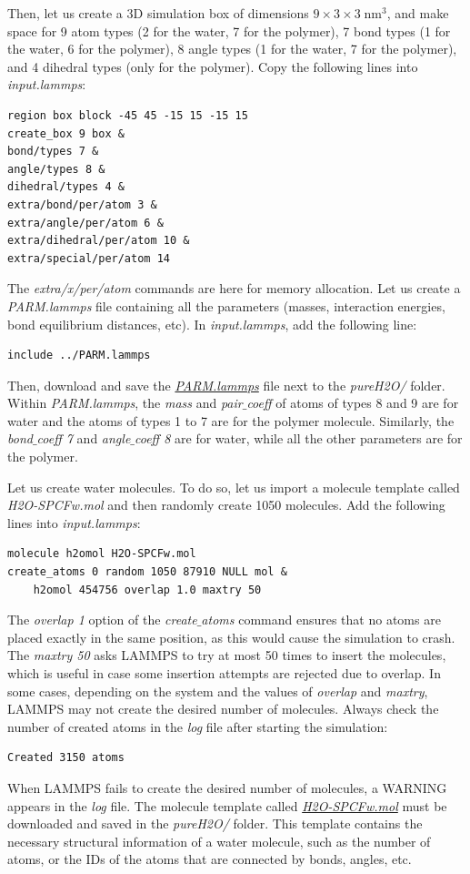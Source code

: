 \documentclass[9pt,tutorial]{livecoms}
\begin{document}
Then, let us create a 3D simulation box of dimensions $9 \times 3 \times 3 \; \text{nm}^3$, and make space for 9 atom types (2 for the water, 7 for the polymer), 7 bond types (1 for the water, 6 for the polymer), 8 angle types (1 for the water, 7 for the polymer), and 4 dihedral types (only for the polymer). Copy the following lines into \textit{input.lammps}:
{\normalsize \begin{verbatim}
region box block -45 45 -15 15 -15 15
create_box 9 box &
bond/types 7 &
angle/types 8 &
dihedral/types 4 &
extra/bond/per/atom 3 &
extra/angle/per/atom 6 &
extra/dihedral/per/atom 10 &
extra/special/per/atom 14
\end{verbatim}}
The \textit{extra/x/per/atom} commands are here for
memory allocation.
Let us create a \textit{PARM.lammps} file containing all the parameters (masses, interaction energies, bond equilibrium
distances, etc). In \textit{input.lammps}, add the following line:
{\normalsize \begin{verbatim}
include ../PARM.lammps
\end{verbatim}}
Then, download and save the \href{https://raw.githubusercontent.com/lammpstutorials/lammpstutorials-article/main/files/tutorial3/PARM.lammps}{\textit{PARM.lammps}} file next to the \textit{pureH2O/} folder. Within \textit{PARM.lammps}, the \textit{mass} and \textit{pair$\_$coeff} of atoms of types 8 and 9 are for water and the atoms of types 1 to 7 are for the polymer molecule. Similarly, the \textit{bond$\_$coeff 7} and \textit{angle$\_$coeff 8} are for water, while all the other parameters are for the polymer.

Let us create water molecules. To do so, let us import a molecule template called
\textit{H2O-SPCFw.mol} and then randomly create 1050 molecules. Add the following lines into \textit{input.lammps}:
{\normalsize \begin{verbatim}
molecule h2omol H2O-SPCFw.mol
create_atoms 0 random 1050 87910 NULL mol &
    h2omol 454756 overlap 1.0 maxtry 50
\end{verbatim}}
The \textit{overlap 1} option of the \textit{create$\_$atoms} command ensures that no atoms are placed exactly in the same position, as this would cause the simulation to crash. The \textit{maxtry 50} asks LAMMPS to try at most 50 times to insert the molecules, which is useful in case some insertion attempts are rejected due to overlap. In some cases, depending on the system and the values of \textit{overlap} and \textit{maxtry}, LAMMPS may not create the desired number of molecules. Always check the number of created atoms in the \textit{log} file after starting the simulation:
{\normalsize \begin{verbatim}
Created 3150 atoms
\end{verbatim}}
When LAMMPS fails to create the desired number of molecules, a WARNING appears in the \textit{log} file. The molecule template called \href{https://raw.githubusercontent.com/lammpstutorials/lammpstutorials-article/main/files/tutorial3/H2O-SPCFw.mol}{\textit{H2O-SPCFw.mol}} must be downloaded and saved in the \textit{pureH2O/} folder. This template contains the necessary structural information of a water molecule, such as the number of atoms, or the IDs of the atoms that are connected by bonds, angles, etc.
\end{document}
